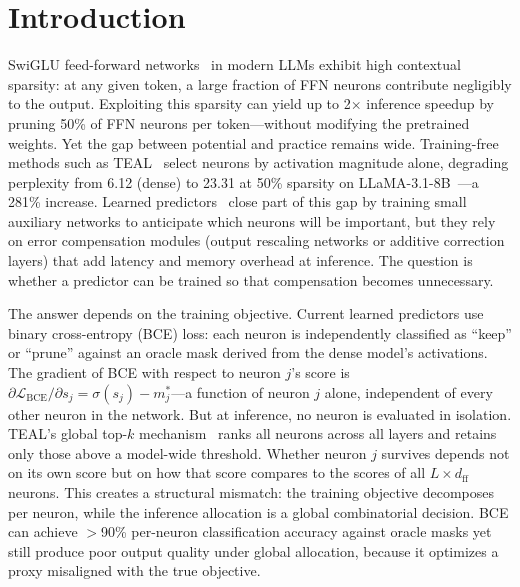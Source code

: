\section{Introduction}

SwiGLU feed-forward networks~\cite{shazeer2020glu} in modern LLMs exhibit high contextual sparsity: at any given token, a large fraction of FFN neurons contribute negligibly to the output.
Exploiting this sparsity can yield up to 2$\times$ inference speedup by pruning 50\% of FFN neurons per token---without modifying the pretrained weights.
Yet the gap between potential and practice remains wide.
Training-free methods such as TEAL~\cite{liu2025teal} select neurons by activation magnitude alone, degrading perplexity from 6.12 (dense) to 23.31 at 50\% sparsity on LLaMA-3.1-8B~\cite{grattafiori2024llama3}---a 281\% increase.
Learned predictors~\cite{liu2023dejavu,gautam2026fastforward} close part of this gap by training small auxiliary networks to anticipate which neurons will be important, but they rely on error compensation modules (output rescaling networks or additive correction layers) that add latency and memory overhead at inference.
The question is whether a predictor can be trained so that compensation becomes unnecessary.

The answer depends on the training objective.
Current learned predictors use binary cross-entropy (BCE) loss: each neuron is independently classified as ``keep'' or ``prune'' against an oracle mask derived from the dense model's activations.
The gradient of BCE with respect to neuron $j$'s score is $\partial \mathcal{L}_{\text{BCE}} / \partial s_j = \sigma(s_j) - m_j^*$---a function of neuron $j$ alone, independent of every other neuron in the network.
But at inference, no neuron is evaluated in isolation.
TEAL's global top-$k$ mechanism~\cite{liu2025teal} ranks all neurons across all layers and retains only those above a model-wide threshold.
Whether neuron $j$ survives depends not on its own score but on how that score compares to the scores of all $L \times d_{\text{ff}}$ neurons.
This creates a structural mismatch: the training objective decomposes per neuron, while the inference allocation is a global combinatorial decision.
BCE can achieve $>$90\% per-neuron classification accuracy against oracle masks yet still produce poor output quality under global allocation, because it optimizes a proxy misaligned with the true objective.

